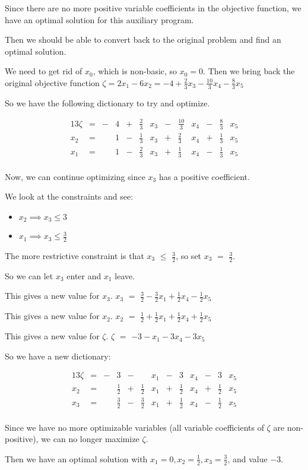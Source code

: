\documentclass[12pt,letterpaper]{article}
\newcommand*\continueopt[1]{
  Now, we can continue optimizing since #1 has a positive coefficient.
}
\newcommand*\enterleave[2]{
  So we can let #1 enter and #2 leave.
}
\newcommand*\morerestrictive[2]{
  The more restrictive constraint is that #1 $\leq$ #2, so set #1 $=$ #2.
}
\newcommand*\newdict{
  So we have a new dictionary:
}
\newcommand*\newvalue[2]{
  This gives a new value for #1. #1 $ = $ #2
}
\newcommand*\opt{
  Since we have no more optimizable variables
  (all variable coefficients of $\zeta$ are non-positive),
  we can no longer maximize $\zeta$.
}
\newcommand*\optsolution[2]{
  Then we have an optimal solution with #1, and value #2.
}
\begin{document}
\begin{enumerate}
      Since there are no more positive variable coefficients in the objective function,
      we have an optimal solution for this auxiliary program.

      Then we should be able to convert back to the original problem and find an optimal solution.

      We need to get rid of $x_0$, which is non-basic, so $x_0 = 0$.
      Then we bring back the original objective function
      $\zeta = 2x_1 - 6x_2 = -4 + \frac{2}{3}x_3 - \frac{10}{3}x_4 - \frac{8}{3}x_5$

      So we have the following dictionary to try and optimize.

      \begin{alignat*}{13}
        \zeta & {}={} & - & 4 & {}+{} & \frac{2}{3} & x_3 & {}-{} & \frac{10}{3} & x_4 & {}-{} & \frac{8}{3} & x_5 \\
        x_2   & {}={} &   & 1 & {}-{} & \frac{1}{3} & x_3 & {}+{} & \frac{2}{3}  & x_4 & {}+{} & \frac{1}{3} & x_5 \\
        x_1   & {}={} &   & 1 & {}-{} & \frac{2}{3} & x_3 & {}+{} & \frac{1}{3}  & x_4 & {}-{} & \frac{1}{3} & x_5 \\
      \end{alignat*}

      \continueopt{$x_3$}

      We look at the constraints and see:
      \begin{itemize}
        \item $x_2 \implies x_3 \leq 3$
        \item $x_1 \implies x_3 \leq \frac{3}{2}$
      \end{itemize}

      \morerestrictive{$x_3$}{$\frac{3}{2}$}

      \enterleave{$x_3$}{$x_1$}

      \newvalue{$x_3$}{$\frac{3}{2} - \frac{3}{2}x_1 + \frac{1}{2}x_4 - \frac{1}{2}x_5$}

      \newvalue{$x_2$}{$\frac{1}{2} + \frac{1}{2}x_1 + \frac{1}{2}x_4 + \frac{1}{2}x_5$}

      \newvalue{$\zeta$}{$-3 - x_1 - 3x_4 - 3x_5$}

      \newdict

      \begin{alignat*}{13}
        \zeta & {}={} & - & 3           & {}-{} &             & x_1 & {}-{} & 3            & x_4 & {}-{} & 3           & x_5 \\
        x_2   & {}={} &   & \frac{1}{2} & {}+{} & \frac{1}{2} & x_1 & {}+{} & \frac{1}{2}  & x_4 & {}+{} & \frac{1}{2} & x_5 \\
        x_3   & {}={} &   & \frac{3}{2} & {}-{} & \frac{3}{2} & x_1 & {}+{} & \frac{1}{2}  & x_4 & {}-{} & \frac{1}{2} & x_5 \\
      \end{alignat*}

      \opt

      \optsolution{$x_1 = 0, x_2 = \frac{1}{2}, x_3 = \frac{3}{2}$}{$-3$}
  \end{enumerate}
\end{document}

